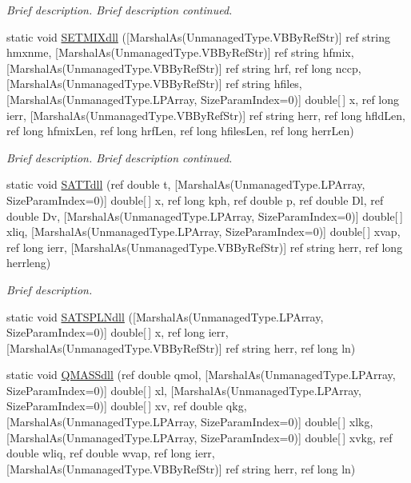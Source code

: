 \begin{DoxyCompactItemize}
\begin{DoxyCompactList}\small\item\em Brief description. Brief description continued. \end{DoxyCompactList}\item 
static void \hyperlink{class_m_c_s_1_1_i_ref_prop64_af3118758f037360f67683b9eab35acbf}{S\+E\+T\+M\+I\+Xdll} (\mbox{[}Marshal\+As(Unmanaged\+Type.\+V\+B\+By\+Ref\+Str)\mbox{]} ref string hmxnme, \mbox{[}Marshal\+As(Unmanaged\+Type.\+V\+B\+By\+Ref\+Str)\mbox{]} ref string hfmix, \mbox{[}Marshal\+As(Unmanaged\+Type.\+V\+B\+By\+Ref\+Str)\mbox{]} ref string hrf, ref long nccp, \mbox{[}Marshal\+As(Unmanaged\+Type.\+V\+B\+By\+Ref\+Str)\mbox{]} ref string hfiles, \mbox{[}Marshal\+As(Unmanaged\+Type.\+L\+P\+Array, Size\+Param\+Index=0)\mbox{]} double\mbox{[}$\,$\mbox{]} x, ref long ierr, \mbox{[}Marshal\+As(Unmanaged\+Type.\+V\+B\+By\+Ref\+Str)\mbox{]} ref string herr, ref long hfld\+Len, ref long hfmix\+Len, ref long hrf\+Len, ref long hfiles\+Len, ref long herr\+Len)
\begin{DoxyCompactList}\small\item\em Brief description. Brief description continued. \end{DoxyCompactList}\item 
static void \hyperlink{class_m_c_s_1_1_i_ref_prop64_ab4f37c2f5e1b185a0e7b43ada9506c3f}{S\+A\+T\+Tdll} (ref double t, \mbox{[}Marshal\+As(Unmanaged\+Type.\+L\+P\+Array, Size\+Param\+Index=0)\mbox{]} double\mbox{[}$\,$\mbox{]} x, ref long kph, ref double p, ref double Dl, ref double Dv, \mbox{[}Marshal\+As(Unmanaged\+Type.\+L\+P\+Array, Size\+Param\+Index=0)\mbox{]} double\mbox{[}$\,$\mbox{]} xliq, \mbox{[}Marshal\+As(Unmanaged\+Type.\+L\+P\+Array, Size\+Param\+Index=0)\mbox{]} double\mbox{[}$\,$\mbox{]} xvap, ref long ierr, \mbox{[}Marshal\+As(Unmanaged\+Type.\+V\+B\+By\+Ref\+Str)\mbox{]} ref string herr, ref long herrleng)
\begin{DoxyCompactList}\small\item\em Brief description. \end{DoxyCompactList}\item 
static void \hyperlink{class_m_c_s_1_1_i_ref_prop64_ae19526af9a48fb45c36f6363cfd98138}{S\+A\+T\+S\+P\+L\+Ndll} (\mbox{[}Marshal\+As(Unmanaged\+Type.\+L\+P\+Array, Size\+Param\+Index=0)\mbox{]} double\mbox{[}$\,$\mbox{]} x, ref long ierr, \mbox{[}Marshal\+As(Unmanaged\+Type.\+V\+B\+By\+Ref\+Str)\mbox{]} ref string herr, ref long ln)
\item 
static void \hyperlink{class_m_c_s_1_1_i_ref_prop64_a02ad2205002fb4af7f6bd35722a49d45}{Q\+M\+A\+S\+Sdll} (ref double qmol, \mbox{[}Marshal\+As(Unmanaged\+Type.\+L\+P\+Array, Size\+Param\+Index=0)\mbox{]} double\mbox{[}$\,$\mbox{]} xl, \mbox{[}Marshal\+As(Unmanaged\+Type.\+L\+P\+Array, Size\+Param\+Index=0)\mbox{]} double\mbox{[}$\,$\mbox{]} xv, ref double qkg, \mbox{[}Marshal\+As(Unmanaged\+Type.\+L\+P\+Array, Size\+Param\+Index=0)\mbox{]} double\mbox{[}$\,$\mbox{]} xlkg, \mbox{[}Marshal\+As(Unmanaged\+Type.\+L\+P\+Array, Size\+Param\+Index=0)\mbox{]} double\mbox{[}$\,$\mbox{]} xvkg, ref double wliq, ref double wvap, ref long ierr, \mbox{[}Marshal\+As(Unmanaged\+Type.\+V\+B\+By\+Ref\+Str)\mbox{]} ref string herr, ref long ln)

\end{DoxyCompactItemize}

